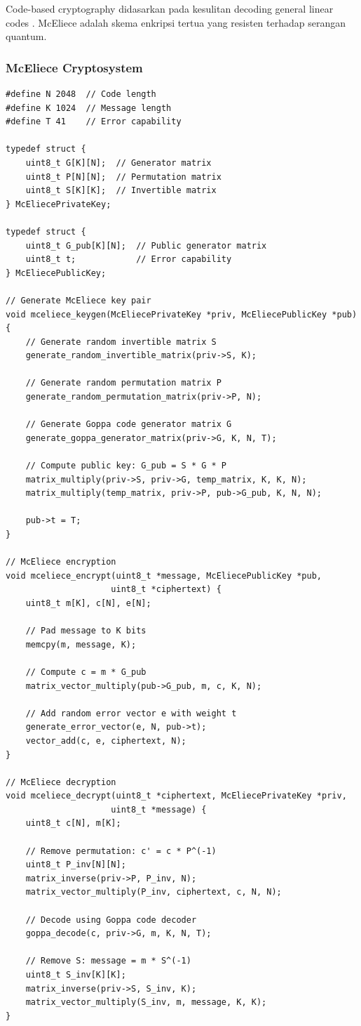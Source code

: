 Code-based cryptography didasarkan pada kesulitan decoding general linear codes \cite{mceliece1978}. McEliece adalah skema enkripsi tertua yang resisten terhadap serangan quantum.

\subsubsection{McEliece Cryptosystem}

\begin{lstlisting}[style=cstyle, caption={McEliece Key Generation}]
#define N 2048  // Code length
#define K 1024  // Message length
#define T 41    // Error capability

typedef struct {
    uint8_t G[K][N];  // Generator matrix
    uint8_t P[N][N];  // Permutation matrix
    uint8_t S[K][K];  // Invertible matrix
} McEliecePrivateKey;

typedef struct {
    uint8_t G_pub[K][N];  // Public generator matrix
    uint8_t t;            // Error capability
} McEliecePublicKey;

// Generate McEliece key pair
void mceliece_keygen(McEliecePrivateKey *priv, McEliecePublicKey *pub) {
    // Generate random invertible matrix S
    generate_random_invertible_matrix(priv->S, K);
    
    // Generate random permutation matrix P
    generate_random_permutation_matrix(priv->P, N);
    
    // Generate Goppa code generator matrix G
    generate_goppa_generator_matrix(priv->G, K, N, T);
    
    // Compute public key: G_pub = S * G * P
    matrix_multiply(priv->S, priv->G, temp_matrix, K, K, N);
    matrix_multiply(temp_matrix, priv->P, pub->G_pub, K, N, N);
    
    pub->t = T;
}

// McEliece encryption
void mceliece_encrypt(uint8_t *message, McEliecePublicKey *pub, 
                     uint8_t *ciphertext) {
    uint8_t m[K], c[N], e[N];
    
    // Pad message to K bits
    memcpy(m, message, K);
    
    // Compute c = m * G_pub
    matrix_vector_multiply(pub->G_pub, m, c, K, N);
    
    // Add random error vector e with weight t
    generate_error_vector(e, N, pub->t);
    vector_add(c, e, ciphertext, N);
}

// McEliece decryption
void mceliece_decrypt(uint8_t *ciphertext, McEliecePrivateKey *priv, 
                     uint8_t *message) {
    uint8_t c[N], m[K];
    
    // Remove permutation: c' = c * P^(-1)
    uint8_t P_inv[N][N];
    matrix_inverse(priv->P, P_inv, N);
    matrix_vector_multiply(P_inv, ciphertext, c, N, N);
    
    // Decode using Goppa code decoder
    goppa_decode(c, priv->G, m, K, N, T);
    
    // Remove S: message = m * S^(-1)
    uint8_t S_inv[K][K];
    matrix_inverse(priv->S, S_inv, K);
    matrix_vector_multiply(S_inv, m, message, K, K);
}
\end{lstlisting}

